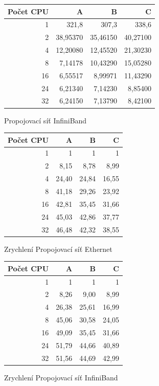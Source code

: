 \documentclass[12pt]{article}
\begin{document}
\begin{figure}[h]
 \caption{Propojovací síť InfiniBand}
\begin{center}
\begin{tabular}{|r|r|r|r|}
\hline
Počet CPU & A & B & C\\
\hline
1 & 321,8 & 307,3 & 338,6\\
\hline
2 & 38,95370 & 35,46150 & 40,27100\\
\hline
4 & 12,20080 & 12,45520 & 21,30230\\
\hline
8 & 7,14178 & 10,43290 & 15,05280\\
\hline
16 & 6,55517 & 8,99971 & 11,43290\\
\hline
24 & 6,21340 & 7,14230 & 8,85400\\
\hline
32 & 6,24150 & 7,13790 & 8,42100\\
\hline
\end{tabular} 
\end{center}
\end{figure}

\begin{figure}[h]
 \caption{Zrychlení Propojovací síť Ethernet}
\begin{center}
\begin{tabular}{|r|r|r|r|}
\hline
Počet CPU & A & B & C\\
\hline
1 & 1 & 1 & 1\\
\hline
2 & 8,15 & 8,78 & 8,99\\
\hline
4 & 24,40 & 24,84 & 16,55\\
\hline
8 & 41,18 & 29,26 & 23,92\\
\hline
16 & 42,81 & 35,45 & 31,66\\
\hline
24 & 45,03 & 42,86 & 37,77\\
\hline
32 & 46,48 & 42,32 & 38,55\\
\hline
\end{tabular}
\end{center}
\end{figure}

\begin{figure}[h]
 \caption{Zrychlení Propojovací síť InfiniBand}
\begin{center}
\begin{tabular}{|r|r|r|r|}
\hline
Počet CPU & A & B & C\\
\hline
1 & 1 & 1 & 1\\
\hline
2 & 8,26 & 9,00 & 8,99\\
\hline
4 & 26,38 & 25,61 & 16,99\\
\hline
8 & 45,06 & 30,58 & 24,05\\
\hline
16 & 49,09 & 35,45 & 31,66\\
\hline
24 & 51,79 & 44,66 & 40,89\\
\hline
32 & 51,56 & 44,69 & 42,99\\
\hline
\end{tabular} 
\end{center}
\end{figure}
\end{document}
